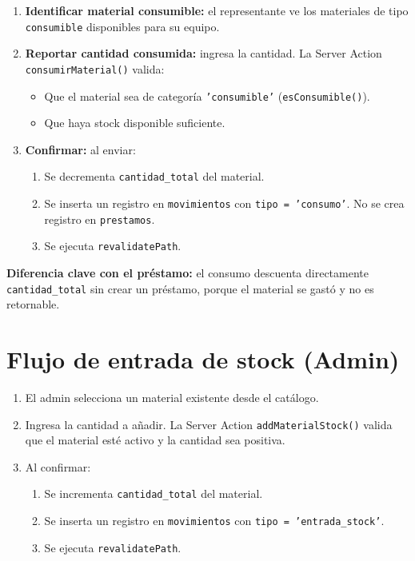 \documentclass[12pt,a4paper,oneside]{report}
\newcommand{\file}[1]{\texttt{\color{cecyteDark}#1}}
\begin{document}
\begin{enumerate}
  \item \textbf{Identificar material consumible:} el representante ve los materiales de tipo \file{consumible} disponibles para su equipo.
  \item \textbf{Reportar cantidad consumida:} ingresa la cantidad. La Server Action \file{consumirMaterial()} valida:
    \begin{itemize}
      \item Que el material sea de categoría \file{'consumible'} (\file{esConsumible()}).
      \item Que haya stock disponible suficiente.
    \end{itemize}
  \item \textbf{Confirmar:} al enviar:
    \begin{enumerate}
      \item Se decrementa \file{cantidad\_total} del material.
      \item Se inserta un registro en \file{movimientos} con \file{tipo = 'consumo'}. No se crea registro en \file{prestamos}.
      \item Se ejecuta \file{revalidatePath}.
    \end{enumerate}
\end{enumerate}

\begin{notebox}
\textbf{Diferencia clave con el préstamo:} el consumo descuenta directamente \file{cantidad\_total} sin crear un préstamo, porque el material se gastó y no es retornable.
\end{notebox}

\section{Flujo de entrada de stock (Admin)}

\begin{enumerate}
  \item El admin selecciona un material existente desde el catálogo.
  \item Ingresa la cantidad a añadir. La Server Action \file{addMaterialStock()} valida que el material esté activo y la cantidad sea positiva.
  \item Al confirmar:
    \begin{enumerate}
      \item Se incrementa \file{cantidad\_total} del material.
      \item Se inserta un registro en \file{movimientos} con \file{tipo = 'entrada\_stock'}.
      \item Se ejecuta \file{revalidatePath}.
    \end{enumerate}
\end{enumerate}
\end{document}
